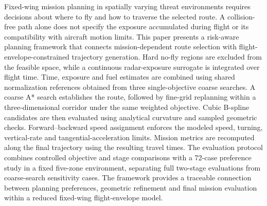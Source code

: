Fixed-wing mission planning in spatially varying threat environments requires
decisions about where to fly and how to traverse the selected route. A
collision-free path alone does not specify the exposure accumulated during
flight or its compatibility with aircraft motion limits. This paper presents
a risk-aware planning framework that connects mission-dependent route
selection with flight-envelope-constrained trajectory generation. Hard
no-fly regions are excluded from the feasible space, while a continuous
radar-exposure surrogate is integrated over flight time. Time, exposure and
fuel estimates are combined using shared normalization references obtained
from three single-objective coarse searches. A coarse A* search establishes
the route, followed by fine-grid replanning within a three-dimensional
corridor under the same weighted objective. Cubic B-spline candidates are
then evaluated using analytical curvature and sampled geometric checks.
Forward--backward speed assignment enforces the modeled speed, turning,
vertical-rate and tangential-acceleration limits. Mission metrics are
recomputed along the final trajectory using the resulting travel times.
The evaluation protocol combines controlled objective and stage comparisons
with a 72-case preference study in a fixed five-zone environment, separating
full two-stage evaluations from coarse-search sensitivity cases.
The framework provides a traceable connection between planning preferences,
geometric refinement and final mission evaluation within a reduced
fixed-wing flight-envelope model.
